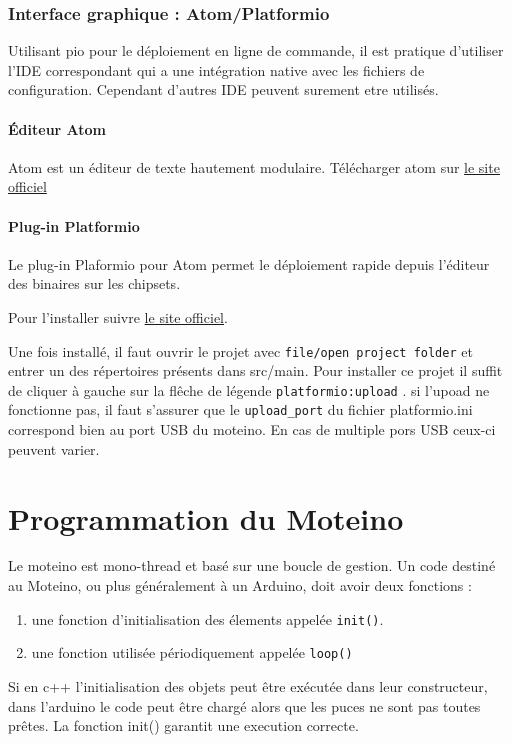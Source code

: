 \documentclass{report}
\begin{document}
\subsection{Interface graphique : Atom/Platformio}

Utilisant pio pour le déploiement en ligne de commande, il est pratique d'utiliser l'IDE correspondant qui a une intégration native avec les fichiers de configuration. Cependant d'autres IDE peuvent surement etre utilisés.

\subsubsection{Éditeur Atom}

Atom est un éditeur de texte hautement modulaire.
Télécharger atom sur \href{https://atom.io/}{le site officiel}

\subsubsection{Plug-in Platformio}

Le plug-in Plaformio pour Atom permet le déploiement rapide depuis l'éditeur des binaires sur les chipsets.

Pour l'installer suivre \href{http://docs.platformio.org/en/stable/ide/atom.html#installation}{le site officiel}.

Une fois installé, il faut ouvrir le projet avec \verb+file/open project folder+ et entrer un des répertoires présents dans src/main. Pour installer ce projet il suffit de cliquer à gauche sur la flêche de légende \verb+platformio:upload+ . si l'upoad ne fonctionne pas, il faut s'assurer que le \verb+upload_port+ du fichier platformio.ini correspond bien au port USB du moteino. En cas de multiple pors USB ceux-ci peuvent varier.

\chapter{Programmation du Moteino}

Le moteino est mono-thread et basé sur une boucle de gestion. Un code destiné au Moteino, ou plus généralement à un Arduino, doit avoir deux fonctions :
\begin{enumerate}
\item une fonction d'initialisation des élements appelée \verb+init()+.
\item une fonction utilisée périodiquement appelée \verb+loop()+
\end{enumerate}
Si en c++ l'initialisation des objets peut être exécutée dans leur constructeur, dans l'arduino le code peut être chargé alors que les puces ne sont pas toutes prêtes. La fonction init() garantit une execution correcte.
\end{document}
